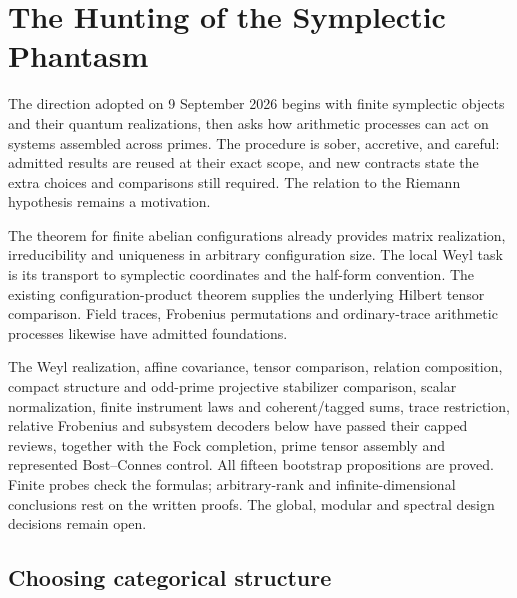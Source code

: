\section{The Hunting of the Symplectic Phantasm}
\label{sec:symplectic-phantasm}

The direction adopted on 9 September 2026 begins with finite symplectic
objects and their quantum realizations, then asks how arithmetic processes
can act on systems assembled across primes. The procedure is sober,
accretive, and careful: admitted results are reused at their exact scope,
and new contracts state the extra choices and comparisons still required.
The relation to the Riemann hypothesis remains a motivation.

The theorem for finite abelian configurations already provides matrix realization,
irreducibility and uniqueness in arbitrary configuration size. The local
Weyl task is its transport to symplectic coordinates and the half-form
convention. The existing configuration-product theorem supplies the
underlying Hilbert tensor comparison. Field traces, Frobenius permutations
and ordinary-trace arithmetic processes likewise have admitted foundations.

The Weyl realization, affine covariance, tensor comparison, relation
composition, compact structure and odd-prime projective stabilizer
comparison, scalar normalization, finite instrument laws and coherent/tagged
sums, trace restriction, relative Frobenius and subsystem decoders below
have passed their capped reviews, together with the Fock completion, prime
tensor assembly and represented Bost--Connes control. All fifteen bootstrap
propositions are proved. Finite probes check the formulas; arbitrary-rank
and infinite-dimensional conclusions rest on the written proofs. The global,
modular and spectral design decisions remain open.

\subsection{Choosing categorical structure}

